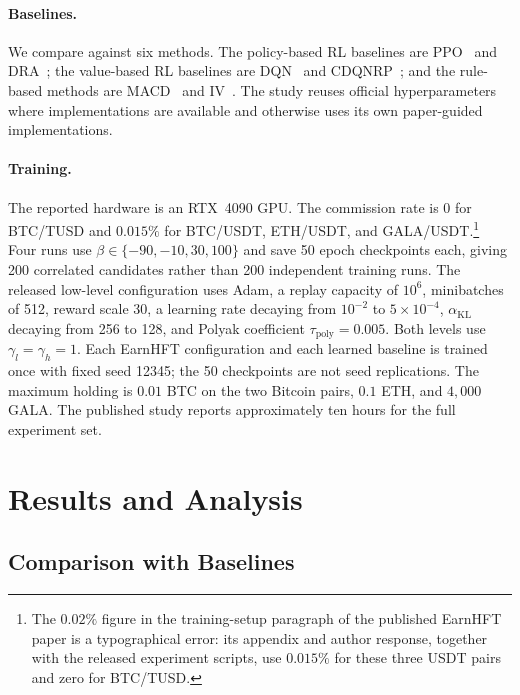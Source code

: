 \paragraph{Baselines.} We compare against six methods. The policy-based RL baselines are PPO~\cite{schulman2017proximal} and DRA~\cite{briola2021deep}; the value-based RL baselines are DQN~\cite{mnih2015human} and CDQNRP~\cite{zhu2022quantitative}; and the rule-based methods are MACD~\cite{appel2005technical} and IV~\cite{chordia2002order}. The study reuses official hyperparameters where implementations are available and otherwise uses its own paper-guided implementations.

\paragraph{Training.} The reported hardware is an RTX~4090 GPU. The commission rate is $0$ for BTC/TUSD and $0.015\%$ for BTC/USDT, ETH/USDT, and GALA/USDT.\footnote{The $0.02\%$ figure in the training-setup paragraph of the published EarnHFT paper is a typographical error: its appendix and author response, together with the released experiment scripts, use $0.015\%$ for these three USDT pairs and zero for BTC/TUSD.} Four runs use $\beta\in\{-90,-10,30,100\}$ and save 50 epoch checkpoints each, giving 200 correlated candidates rather than 200 independent training runs. The released low-level configuration uses Adam, a replay capacity of $10^{6}$, minibatches of 512, reward scale 30, a learning rate decaying from $10^{-2}$ to $5\times10^{-4}$, $\alpha_{\mathrm{KL}}$ decaying from 256 to 128, and Polyak coefficient $\tau_{\mathrm{poly}}=0.005$. Both levels use $\gamma_l=\gamma_h=1$. Each EarnHFT configuration and each learned baseline is trained once with fixed seed 12345; the 50 checkpoints are not seed replications. The maximum holding is $0.01$ BTC on the two Bitcoin pairs, $0.1$ ETH, and $4{,}000$ GALA. The published study reports approximately ten hours for the full experiment set.

\section{Results and Analysis}
\label{sec:earnhft_results}

\subsection{Comparison with Baselines}
\label{sec:earnhft_comparison}

